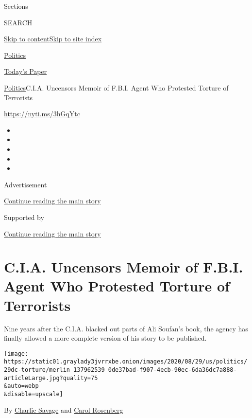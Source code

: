 Sections

SEARCH

\protect\hyperlink{site-content}{Skip to
content}\protect\hyperlink{site-index}{Skip to site index}

\href{https://www.nytimes3xbfgragh.onion/section/politics}{Politics}

\href{https://myaccount.nytimes3xbfgragh.onion/auth/login?response_type=cookie\&client_id=vi}{}

\href{https://www.nytimes3xbfgragh.onion/section/todayspaper}{Today's
Paper}

\href{/section/politics}{Politics}\textbar{}C.I.A. Uncensors Memoir of
F.B.I. Agent Who Protested Torture of Terrorists

\url{https://nyti.ms/3hGqYtc}

\begin{itemize}
\item
\item
\item
\item
\item
\end{itemize}

Advertisement

\protect\hyperlink{after-top}{Continue reading the main story}

Supported by

\protect\hyperlink{after-sponsor}{Continue reading the main story}

\hypertarget{cia-uncensors-memoir-of-fbi-agent-who-protested-torture-of-terrorists}{%
\section{C.I.A. Uncensors Memoir of F.B.I. Agent Who Protested Torture
of
Terrorists}\label{cia-uncensors-memoir-of-fbi-agent-who-protested-torture-of-terrorists}}

Nine years after the C.I.A. blacked out parts of Ali Soufan's book, the
agency has finally allowed a more complete version of his story to be
published.

\texttt{[image: https://static01.graylady3jvrrxbe.onion/images/2020/08/29/us/politics/29dc-torture/merlin\_137962539\_0de37bad-f907-4ecb-90ec-6da36dc7a888-articleLarge.jpg?quality=75\\\&auto=webp\\\&disable=upscale]}

By \href{https://www.nytimes3xbfgragh.onion/by/charlie-savage}{Charlie
Savage} and
\href{https://www.nytimes3xbfgragh.onion/by/carol-rosenberg}{Carol
Rosenberg}


